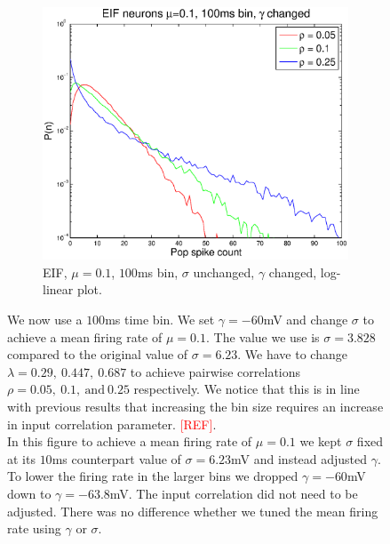\documentclass[11pt]{article}
\begin{document}
\begin{figure}[H]
\begin{subfigure}[h]{0.5\textwidth}
	\centering
	\includegraphics[width=\textwidth]{../Figures/EIF/EIF_Macke_2a_100ms_gamma_semilog}
	\caption{\footnotesize EIF, $\mu = 0.1$, $100$ms bin, $\sigma$ unchanged, $\gamma$ changed, log-linear plot.}
	\label{fig4}
	\end{subfigure}
	\caption{\footnotesize We now use a $100$ms time bin. We set $\gamma = -60$mV and change $\sigma$ to achieve a mean firing rate of $\mu = 0.1$. The value we use is $\sigma = 3.828$ compared to the original value of $\sigma = 6.23$. We have to change $\lambda = 0.29,~0.447,~0.687$ to achieve pairwise correlations $\rho = 0.05,~0.1,~\text{and}~0.25$ respectively. We notice that this is in line with previous results that increasing the bin size requires an increase in input correlation parameter. \textcolor{red}{[REF]}.\\
	In this figure to achieve a mean firing rate of $\mu = 0.1$ we kept $\sigma$ fixed at its $10$ms counterpart value of $\sigma = 6.23$mV and instead adjusted $\gamma$. To lower the firing rate in the larger bins we dropped $\gamma = -60$mV down to $\gamma = -63.8$mV. The input correlation did not need to be adjusted. There was no difference whether we tuned the mean firing rate using $\gamma$ or $\sigma$.}
\end{figure}
\end{document}
